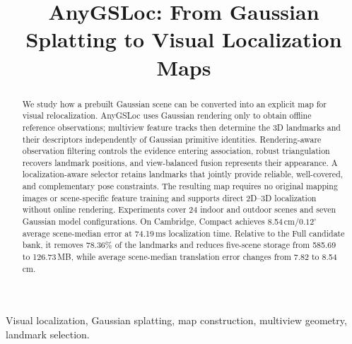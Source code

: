 \documentclass[journal]{IEEEtran}
\title{AnyGSLoc: From Gaussian Splatting to Visual Localization Maps}
\author{}
\begin{document}
\maketitle
\begin{abstract}
We study how a prebuilt Gaussian scene can be converted into an explicit map for visual relocalization. AnyGSLoc uses Gaussian rendering only to obtain offline reference observations; multiview feature tracks then determine the 3D landmarks and their descriptors independently of Gaussian primitive identities. Rendering-aware observation filtering controls the evidence entering association, robust triangulation recovers landmark positions, and view-balanced fusion represents their appearance. A localization-aware selector retains landmarks that jointly provide reliable, well-covered, and complementary pose constraints. The resulting map requires no original mapping images or scene-specific feature training and supports direct 2D--3D localization without online rendering. Experiments cover 24 indoor and outdoor scenes and seven Gaussian model configurations. On Cambridge, Compact achieves 8.54\,cm/$0.12^\circ$ average scene-median error at 74.19\,ms localization time. Relative to the Full candidate bank, it removes 78.36\% of the landmarks and reduces five-scene storage from 585.69 to 126.73\,MB, while average scene-median translation error changes from 7.82 to 8.54\,cm.
\end{abstract}
\begin{IEEEkeywords}
Visual localization, Gaussian splatting, map construction, multiview geometry, landmark selection.
\end{IEEEkeywords}







\end{document}
